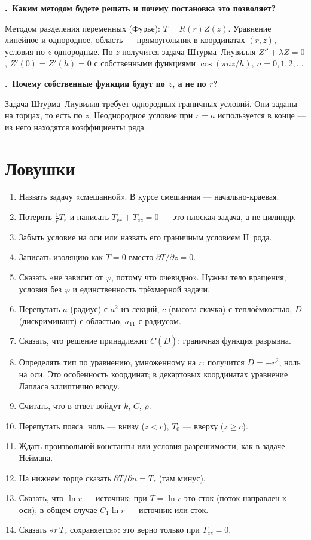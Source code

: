 \documentclass[a4paper,12pt]{article}
\renewcommand{\ge}{\geqslant}
\newcounter{qa}
\newcommand{\q}[1]{\par\medskip\refstepcounter{qa}%
  \textbf{\theqa.~#1}\par\nopagebreak[4]}
\begin{document}
\q{Каким методом будете решать и почему постановка это позволяет?}
Методом разделения переменных (Фурье): $T=R(r)Z(z)$. Уравнение линейное и
однородное, область — прямоугольник в координатах $(r,z)$, условия по $z$
однородные. По $z$ получится задача Штурма–Лиувилля $Z''+\lambda Z=0$,
$Z'(0)=Z'(h)=0$ с собственными функциями $\cos(\pi nz/h)$, $n=0,1,2,\dots$

\q{Почему собственные функции будут по $z$, а не по $r$?}
Задача Штурма–Лиувилля требует однородных граничных условий. Они заданы на
торцах, то есть по $z$. Неоднородное условие при $r=a$ используется
в конце — из него находятся коэффициенты ряда.

\section{Ловушки}

\begin{enumerate}
  \item Назвать задачу «смешанной». В курсе смешанная — начально-краевая.
  \item Потерять $\frac1r T_r$ и написать $T_{rr}+T_{zz}=0$ — это плоская
  задача, а не цилиндр.
  \item Забыть условие на оси или назвать его граничным условием II~рода.
  \item Записать изоляцию как $T=0$ вместо $\partial T/\partial z=0$.
  \item Сказать «не зависит от $\varphi$, потому что очевидно». Нужны тело
  вращения, условия без $\varphi$ и единственность трёхмерной задачи.
  \item Перепутать $a$ (радиус) с $a^2$ из лекций, $c$ (высота скачка)
  с теплоёмкостью, $D$ (дискриминант) с областью, $a_{11}$ с радиусом.
  \item Сказать, что решение принадлежит $C(\overline D)$: граничная функция
  разрывна.
  \item Определять тип по уравнению, умноженному на $r$: получится
  $D=-r^2$, ноль на оси. Это особенность координат; в декартовых
  координатах уравнение Лапласа эллиптично всюду.
  \item Считать, что в ответ войдут $k$, $C$, $\rho$.
  \item Перепутать пояса: ноль — внизу ($z<c$), $T_0$ — вверху ($z\ge c$).
  \item Ждать произвольной константы или условия разрешимости, как в задаче
  Неймана.
  \item На нижнем торце сказать $\partial T/\partial n=T_z$ (там минус).
  \item Сказать, что $\ln r$ — источник: при $T=\ln r$ это сток (поток
  направлен к оси); в общем случае $C_1\ln r$ — источник или сток.
  \item Сказать «$r\,T_r$ сохраняется»: это верно только при $T_{zz}=0$.
\end{enumerate}
\end{document}
